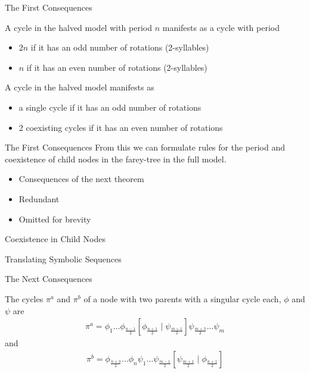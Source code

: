 \begin{frame}{The First Consequences}
	\begin{theorem}
		A cycle in the halved model with period $n$ manifests as a cycle with period
		\begin{itemize}
			\item $2n$ if it has an odd number of rotations (2-syllables)
			\item $n$ if it has an even number of rotations (2-syllables)
		\end{itemize}
	\end{theorem}
	\pause
	\begin{theorem}
		A cycle in the halved model manifests as
		\begin{itemize}
			\item a single cycle if it has an odd number of rotations
			\item 2 coexisting cycles if it has an even number of rotations
		\end{itemize}
	\end{theorem}
\end{frame}

\begin{frame}{The First Consequences}
	From this we can formulate rules for the period and coexistence of child nodes in the farey-tree in the full model.
	\pause
	\begin{itemize}
		\item Consequences of the next theorem \pause
		\item Redundant \pause
		\item Omitted for brevity
	\end{itemize}
	\begin{theorem}{Coexistence in Child Nodes}
	\end{theorem}
\end{frame}

\begin{frame}{Translating Symbolic Sequences}
\end{frame}

\begin{frame}{The Next Consequences}
	\begin{theorem}
		The cycles $\pi^a$ and $\pi^b$ of a node with two parents with a singular cycle each, $\phi$ and $\psi$ are
		\begin{align*}
			\pi^a = \phi_1 \dots \phi_{\frac{n-1}{2}} \left[\phi_{\frac{n+1}{2}} \mid \psi_{\frac{m+1}{2}}\right] \psi_{\frac{m+3}{2}} \dots \psi_m
		\end{align*}
		and
		\begin{align*}
			\pi^b =  \phi_{\frac{n+3}{2}} \dots \phi_n \psi_1 \dots \psi_{\frac{m-1}{2}} \left[\psi_{\frac{m+1}{2}} \mid \phi_{\frac{n+1}{2}}\right]
		\end{align*}
	\end{theorem}
\end{frame}

